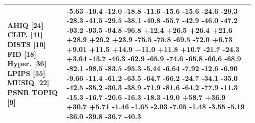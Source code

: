 \begin{tabular}{ll}
\toprule
AHIQ [24] CLIP. [41] DISTS [10] FID [18] Hyper. [36] LPIPS [55] MUSIQ [22] PSNR TOPIQ [9] & -5.63 -10.4 -12.0 -18.8 -11.6 -15.6 -15.6 -24.6 -29.3 -28.3 -41.5 -29.5 -38.1 -40.8 -55.7 -42.9 -46.0 -47.2 -93.2 -93.5 -94.8 -96.8 +12.4 +26.5 +26.4 +21.6 +28.9 +26.2 +23.9 -75.5 -75.8 -69.5 -72.0 +6.73 +9.01 +11.5 +14.9 +11.0 +11.8 +10.7 -21.7 -24.3 +3.64 -13.7 -46.3 -62.9 -65.9 -74.6 -65.8 -66.6 -68.9 -82.1 -98.5 -83.5 -95.3 -5.44 -6.64 -7.92 -12.6 -6.90 -9.66 -11.4 -61.2 -63.5 -64.7 -66.2 -24.7 -34.1 -35.0 -42.5 -35.2 -36.3 -38.9 -71.9 -81.6 -64.2 -77.9 -11.3 -15.3 -16.7 -20.6 -16.3 -18.3 -19.0 +58.7 +36.9 +30.7 +5.71 -1.46 -1.65 -2.03 -7.05 -1.48 -3.55 -5.19 -36.0 -39.8 -36.7 -40.3 \\
\midrule
\bottomrule
\end{tabular}
